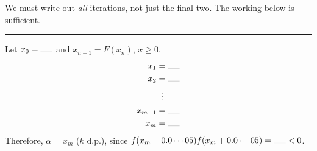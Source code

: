 \documentclass[../Notes.tex]{subfiles}
\begin{document}
\begin{note}
    We must write out \emph{all} iterations, not just the final two. The working below is sufficient.

    \rule{20cm-137.0549pt}{0.05mm}

    \vspace{0.5\baselineskip} Let \(x_0=\rule{0.5cm}{0.05mm}\) and \(x_{n+1}=F(x_n)\), \(x\geq 0\).
    \begin{align*}
        x_1&=\rule{0.5cm}{0.05mm}\\
        x_2&=\rule{0.5cm}{0.05mm}\\
        &\vdotswithin{=}\\
        x_{m-1}&=\rule{0.5cm}{0.05mm}\\
        x_m&=\rule{0.5cm}{0.05mm}
    \end{align*}
    Therefore, \(\alpha=x_m\) (\(k\) d.p.), since \(f(x_m-0.0\cdots05)f(x_m+0.0\cdots05)=\rule{0.5cm}{0.01mm}<0\).
\end{note}
\end{document}
